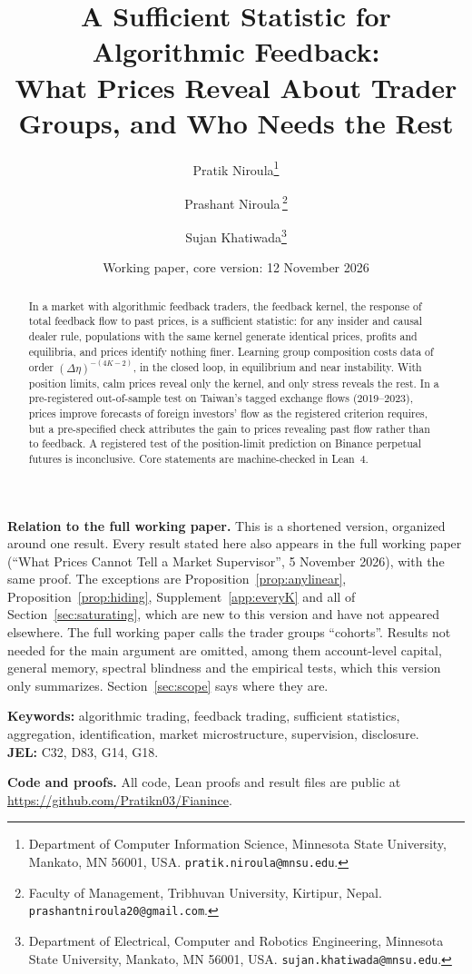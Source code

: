 \documentclass[12pt]{article}
\title{A Sufficient Statistic for Algorithmic Feedback:\\ What Prices Reveal About Trader Groups, and Who Needs the Rest}
\author{Pratik Niroula\thanks{Department of Computer Information Science, Minnesota State University, Mankato, MN 56001, USA. \texttt{pratik.niroula@mnsu.edu}.}
\and Prashant Niroula\,\thanks{Faculty of Management, Tribhuvan University, Kirtipur, Nepal. \texttt{prashantniroula20@gmail.com}.}
\and Sujan Khatiwada\thanks{Department of Electrical, Computer and Robotics Engineering, Minnesota State University, Mankato, MN 56001, USA. \texttt{sujan.khatiwada@mnsu.edu}.}}
\date{Working paper, core version: 12 November 2026}
\theoremstyle{definition}
\theoremstyle{remark}
\begin{document}
\maketitle
\thispagestyle{empty}\pagestyle{empty}
\begingroup\onehalfspacing

\begin{abstract}
\noindent In a market with algorithmic feedback traders, the feedback kernel, the response of total feedback flow to past prices, is a sufficient statistic: for any insider and causal dealer rule, populations with the same kernel generate identical prices, profits and equilibria, and prices identify nothing finer. Learning group composition costs data of order $(\Delta\eta)^{-(4K-2)}$, in the closed loop, in equilibrium and near instability. With position limits, calm prices reveal only the kernel, and only stress reveals the rest. In a pre-registered out-of-sample test on Taiwan's tagged exchange flows (2019--2023), prices improve forecasts of foreign investors' flow as the registered criterion requires, but a pre-specified check attributes the gain to prices revealing past flow rather than to feedback. A registered test of the position-limit prediction on Binance perpetual futures is inconclusive. Core statements are machine-checked in Lean~4.
\end{abstract}

\noindent\textbf{Relation to the full working paper.} This is a shortened version, organized around one result. Every result stated here also appears in the full working paper (``What Prices Cannot Tell a Market Supervisor'', 5 November 2026), with the same proof. The exceptions are Proposition~\ref{prop:anylinear}, Proposition~\ref{prop:hiding}, Supplement~\ref{app:everyK} and all of Section~\ref{sec:saturating}, which are new to this version and have not appeared elsewhere. The full working paper calls the trader groups ``co\-horts''. Results not needed for the main argument are omitted, among them account-level capital, general memory, spectral blindness and the empirical tests, which this version only summarizes. Section~\ref{sec:scope} says where they are.

\noindent\textbf{Keywords:} algorithmic trading, feedback trading, sufficient statistics, aggregation, identification, market microstructure, supervision, disclosure.\\
\textbf{JEL:} C32, D83, G14, G18.

\noindent\textbf{Code and proofs.} All code, Lean proofs and result files are public at \url{https://github.com/Pratikn03/Fianince}.
\end{document}
